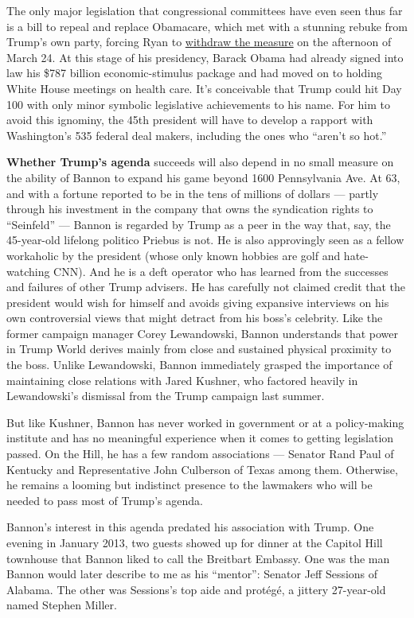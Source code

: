 The only major legislation that congressional committees have even seen
thus far is a bill to repeal and replace Obamacare, which met with a
stunning rebuke from Trump's own party, forcing Ryan to
\href{https://www.nytimes3xbfgragh.onion/2017/03/24/us/politics/health-care-affordable-care-act.html}{withdraw
the measure} on the afternoon of March 24. At this stage of his
presidency, Barack Obama had already signed into law his \$787 billion
economic-stimulus package and had moved on to holding White House
meetings on health care. It's conceivable that Trump could hit Day 100
with only minor symbolic legislative achievements to his name. For him
to avoid this ignominy, the 45th president will have to develop a
rapport with Washington's 535 federal deal makers, including the ones
who ``aren't so hot.''

\textbf{Whether Trump's agenda} succeeds will also depend in no small
measure on the ability of Bannon to expand his game beyond 1600
Pennsylvania Ave. At 63, and with a fortune reported to be in the tens
of millions of dollars --- partly through his investment in the company
that owns the syndication rights to ``Seinfeld'' --- Bannon is regarded
by Trump as a peer in the way that, say, the 45-year-old lifelong
politico Priebus is not. He is also approvingly seen as a fellow
workaholic by the president (whose only known hobbies are golf and
hate-watching CNN). And he is a deft operator who has learned from the
successes and failures of other Trump advisers. He has carefully not
claimed credit that the president would wish for himself and avoids
giving expansive interviews on his own controversial views that might
detract from his boss's celebrity. Like the former campaign manager
Corey Lewandowski, Bannon understands that power in Trump World derives
mainly from close and sustained physical proximity to the boss. Unlike
Lewandowski, Bannon immediately grasped the importance of maintaining
close relations with Jared Kushner, who factored heavily in
Lewandowski's dismissal from the Trump campaign last summer.

But like Kushner, Bannon has never worked in government or at a
policy-making institute and has no meaningful experience when it comes
to getting legislation passed. On the Hill, he has a few random
associations --- Senator Rand Paul of Kentucky and Representative John
Culberson of Texas among them. Otherwise, he remains a looming but
indistinct presence to the lawmakers who will be needed to pass most of
Trump's agenda.

Bannon's interest in this agenda predated his association with Trump.
One evening in January 2013, two guests showed up for dinner at the
Capitol Hill townhouse that Bannon liked to call the Breitbart Embassy.
One was the man Bannon would later describe to me as his ``mentor'':
Senator Jeff Sessions of Alabama. The other was Sessions's top aide and
protégé, a jittery 27-year-old named Stephen Miller.

